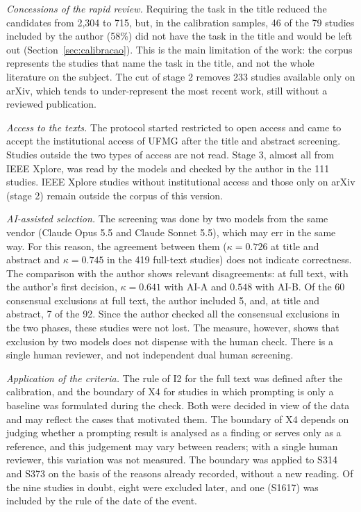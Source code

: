 \textit{Concessions of the rapid review.} Requiring the task in the title reduced the candidates from 2,304 to 715, but, in the
calibration samples, 46 of the 79 studies included by the author (58\%) did not have the task in the title and would be left
out (Section~\ref{sec:calibracao}). This is the main limitation of the work: the corpus represents the studies that
name the task in the title, and not the whole literature on the subject. The cut of stage 2 removes 233 studies available
only on arXiv, which tends to under-represent the most recent work, still without a reviewed publication.

\textit{Access to the texts.} The protocol started restricted to open access and came to accept the institutional access
of UFMG after the title and abstract screening. Studies outside the two types of access are not read. Stage 3,
almost all from IEEE Xplore, was read by the models and checked by the author in the 111 studies. IEEE Xplore studies
without institutional access and those only on arXiv (stage 2) remain outside the corpus of this version.

\textit{AI-assisted selection.} The screening was done by two models from the same vendor (Claude Opus 5.5 and Claude
Sonnet 5.5), which may err in the same way. For this reason, the agreement between them ($\kappa = 0.726$ at title and
abstract and $\kappa = 0.745$ in the 419 full-text studies) does not indicate correctness. The comparison with the author shows
relevant disagreements: at full text, with the author's first decision, $\kappa = 0.641$ with AI-A and
$0.548$ with AI-B. Of the 60 consensual exclusions at
full text, the author included 5, and, at title and abstract, 7 of the 92. Since the author checked all the consensual
exclusions in the two phases, these studies were not lost. The measure, however, shows that exclusion by two
models does not dispense with the human check. There is a single human reviewer, and not independent dual human
screening.

\textit{Application of the criteria.} The rule of I2 for the full text was defined after the calibration, and the boundary of
X4 for studies in which prompting is only a baseline was formulated during the check. Both were decided
in view of the data and may reflect the cases that motivated them. The boundary of X4 depends on judging whether a prompting result is
analysed as a finding or serves only as a reference, and this judgement may vary between readers; with a single
human reviewer, this variation was not measured. The boundary was applied to S314 and S373 on the basis of the reasons already
recorded, without a new reading. Of the nine studies in doubt, eight were excluded later, and one (S1617) was included by the
rule of the date of the event.

